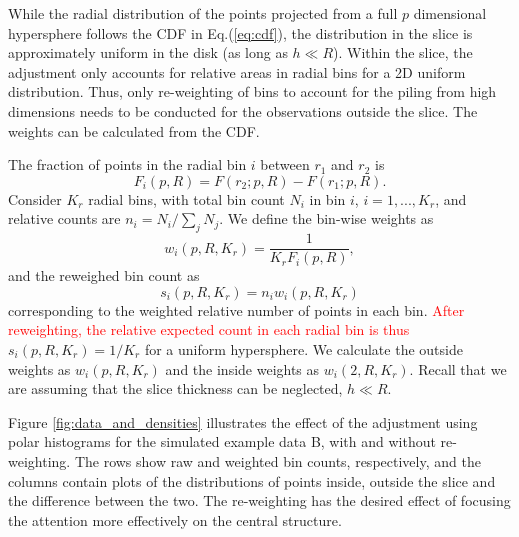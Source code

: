 \documentclass[]{interact}
\theoremstyle{plain}%
\theoremstyle{definition}
\theoremstyle{remark}
\begin{document}
While the radial distribution of the points projected from a full \(p\)
dimensional hypersphere follows the CDF in Eq.(\ref{eq:cdf}), the
distribution in the slice is approximately uniform in the disk (as long
as \(h \ll R\)). Within the slice, the adjustment only accounts for
relative areas in radial bins for a 2D uniform distribution. Thus, only
re-weighting of bins to account for the piling from high dimensions
needs to be conducted for the observations outside the slice. The
weights can be calculated from the CDF.

The fraction of points in the radial bin \(i\) between \(r_1\) and
\(r_2\) is \begin{equation}
F_{i}(p, R) = F(r_2; p, R) - F(r_1; p, R).
\label{eq:frac}
\end{equation} Consider \(K_r\) radial bins, with total bin count
\(N_i\) in bin \(i\), \(i = 1,...,K_r\), and relative counts are
\(n_i = N_i / \sum_j N_j\). We define the bin-wise weights as
\begin{equation}
w_i(p, R, K_r) = \frac{1}{K_r F_i(p,R)},
\end{equation} and the reweighed bin count as \begin{equation}
s_i(p, R, K_r) = n_i w_i(p, R, K_r)
\label{eq:reweight}
\end{equation} corresponding to the weighted relative number of points
in each bin.
\textcolor{red}{After reweighting, the relative expected count in each radial bin is thus}
\(s_i(p,R,K_r) = 1/K_r\) for a uniform hypersphere. We calculate the
outside weights as \(w_i(p, R, K_r)\) and the inside weights as
\(w_i(2, R, K_r)\). Recall that we are assuming that the slice thickness
can be neglected, \(h\ll R\).

Figure \ref{fig:data_and_densities} illustrates the effect of the
adjustment using polar histograms for the simulated example data B, with
and without re-weighting. The rows show raw and weighted bin counts,
respectively, and the columns contain plots of the distributions of
points inside, outside the slice and the difference between the two. The
re-weighting has the desired effect of focusing the attention more
effectively on the central structure.
\end{document}
